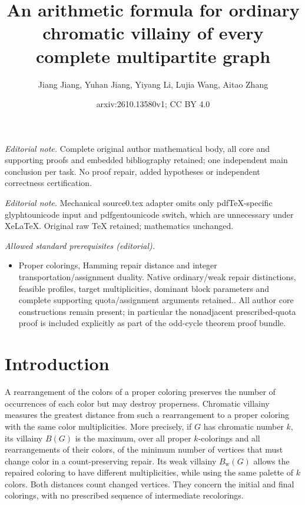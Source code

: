 \documentclass[10pt,a4paper]{amsart}
\title{An arithmetic formula for ordinary chromatic villainy of every complete multipartite graph}
\author{Jiang Jiang, Yuhan Jiang, Yiyang Li, Lujia Wang, Aitao Zhang}
\date{arxiv:2610.13580v1; CC BY 4.0}
\numberwithin{equation}{section}
\theoremstyle{definition}
\theoremstyle{remark}
\begin{document}
\maketitle
\noindent\textit{Editorial note.} Complete original author mathematical body, all core and supporting proofs and embedded bibliography retained; one independent main conclusion per task. No proof repair, added hypotheses or independent correctness certification.\par\medskip
\noindent\textit{Editorial note.} Mechanical source0.tex adapter omits only pdfTeX-specific glyphtounicode input and pdfgentounicode switch, which are unnecessary under XeLaTeX. Original raw TeX retained; mathematics unchanged.\par\medskip
\noindent\textit{Allowed standard prerequisites (editorial).}\begin{itemize}
\item Proper colorings, Hamming repair distance and integer transportation/assignment duality. Native ordinary/weak repair distinctions, feasible profiles, target multiplicities, dominant block parameters and complete supporting quota/assignment arguments retained.. All author core constructions remain present; in particular the nonadjacent prescribed-quota proof is included explicitly as part of the odd-cycle theorem proof bundle.
\end{itemize}\medskip
\section{Introduction}

A rearrangement of the colors of a proper coloring preserves the number
of occurrences of each color but may destroy properness. Chromatic
villainy measures the greatest distance from such a rearrangement to a
proper coloring with the same color multiplicities. More precisely, if
$G$ has chromatic number $k$, its villainy $B(G)$ is the maximum, over
all proper $k$-colorings and all rearrangements of their colors, of the
minimum number of vertices that must change color in a count-preserving
repair. Its weak villainy $B_{\mathrm w}(G)$ allows the repaired
coloring to have different multiplicities, while using the same palette
of $k$ colors. Both distances count changed vertices. They concern the
initial and final colorings, with no prescribed sequence of intermediate
recolorings.
\end{document}
